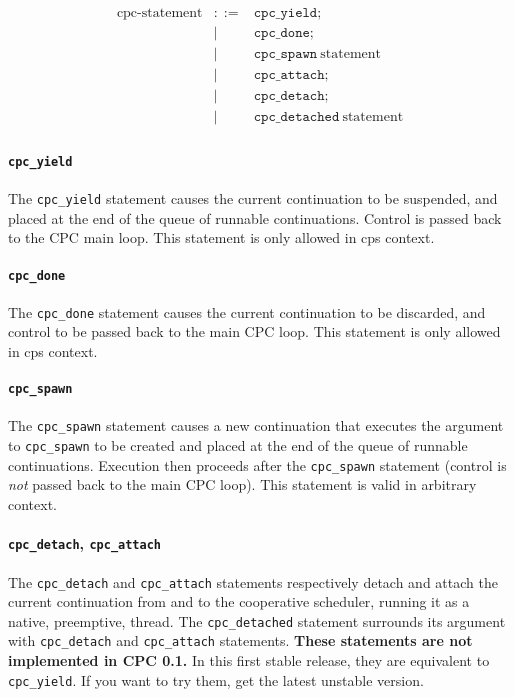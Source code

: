 \documentclass[a4paper]{report}
\begin{document}
\begin{eqnarray*}
\mbox{cpc-statement} & ::= & 
     \mathtt{cpc\_yield} \mathtt{;} \\
 &|& \mathtt{cpc\_done} \mathtt{;} \\
 &|& \mathtt{cpc\_spawn}\ \mbox{statement} \\
 &|& \mathtt{cpc\_attach} \mathtt{;} \\
 &|& \mathtt{cpc\_detach} \mathtt{;} \\
 &|& \mathtt{cpc\_detached}\ \mbox{statement} \\
\end{eqnarray*}

\paragraph{\tt cpc\_yield} The {\tt cpc\_yield} statement causes the
current continuation to be suspended, and placed at the end of the
queue of runnable continuations.  Control is passed back to the CPC
main loop.  This statement is only allowed in cps context.

\paragraph{\tt cpc\_done} The {\tt cpc\_done} statement causes the
current continuation to be discarded, and control to be passed back to
the main CPC loop.  This statement is only allowed in cps context.

\paragraph{\tt cpc\_spawn} The {\tt cpc\_spawn} statement causes a new
continuation that executes the argument to {\tt cpc\_spawn} to be
created and placed at the end of the queue of runnable continuations.
Execution then proceeds after the {\tt cpc\_spawn} statement (control
is {\em not\/} passed back to the main CPC loop).  This statement is
valid in arbitrary context.

\paragraph{{\tt cpc\_detach}, {\tt cpc\_attach}} The {\tt cpc\_detach}
and {\tt cpc\_attach} statements respectively detach and attach the
current continuation from and to the cooperative scheduler, running it
as a native, preemptive, thread. The {\tt cpc\_detached} statement
surrounds its argument with {\tt cpc\_detach} and {\tt cpc\_attach}
statements.  {\bf These statements are not implemented in CPC 0.1.} In
this first stable release, they are equivalent to {\tt cpc\_yield}. If
you want to try them, get the latest unstable version.
\end{document}
